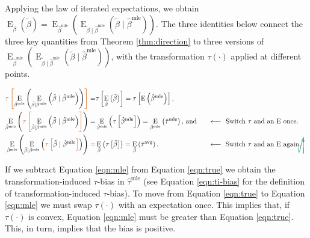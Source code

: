 \documentclass[11pt]{article}
\DeclareMathOperator*{\E}{\text{E}}
\newcommand{\tikzmark}[1]{\tikz[overlay,remember picture] \node (#1) {};}
\newcommand{\DrawBox}[2]{%
  \begin{tikzpicture}[overlay,remember picture]
    \draw[->,shorten >= 6pt, shorten <= 2pt, out=-90, in=90, distance=1.2cm, color2, thick] (MarkA.east) to (MarkB.east);
    \draw[->,shorten >= 6pt, shorten <= 2pt, out=-90, in=90, distance=1cm, color2, thick] (MarkC.west) to (MarkD.east);
  \end{tikzpicture}
}
\newcommand{\justif}[2]{&{#1}&\text{#2}}
\begin{document}
Applying the law of iterated expectations, we obtain $\E_{\tilde{\beta}} \left( \tilde{\beta} \right) = \E_{\hat{\beta}^\text{mle}}\left( \E_{\tilde{\beta} \mid \hat{\beta}^\text{mle}} (\tilde{\beta} \mid \hat{\beta}^\text{mle}) \right)$.
The three identities below connect the three key quantities from Theorem \ref{thm:direction} to three versions of $\E_{\hat{\beta}^\text{mle}}\left( \E_{\tilde{\beta} \mid \hat{\beta}^\text{mle}} (\tilde{\beta} \mid \hat{\beta}^\text{mle}) \right)$, with the transformation $\tau(\cdot)$ applied at different points.


\begin{alignat}{2}
 \color{color1} \tikzmark{MarkA}\tau \left[ \normalcolor \E_{\hat{\beta}^\text{mle}}\left( \E_{\tilde{\beta} \mid \hat{\beta}^\text{mle}} \left( \tilde{\beta} \mid \hat{\beta}^\text{mle} \right) \right) \color{color1} \right] \normalcolor =&  \tau \left[ \E_{\tilde{\beta}} \left( \tilde{\beta} \right) \right] = \tau \left[\E \left( \hat{\beta}^\text{mle} \right) \right]\text{,} \label{eqn:true}\\
 \E_{\hat{\beta}^\text{mle}}\left( \color{color1} \tikzmark{MarkB}\tau\tikzmark{MarkC} \left[ \normalcolor \E_{\tilde{\beta} \mid \hat{\beta}^\text{mle}} \left( \tilde{\beta} \mid \hat{\beta}^\text{mle} \right) \color{color1} \right] \normalcolor \right)  =&  \E_{\hat{\beta}^\text{mle}} \left( \tau \left[\hat{\beta}^\text{mle} \right] \right) =  \E_{\hat{\beta}^\text{mle}} \left(\hat{\tau}^\text{mle} \right) \text{, and} \justif{\quad}{$\longleftarrow~$ Switch $\tau$ and an $\E$ once.} \label{eqn:mle}\\
\E_{\hat{\beta}^\text{mle}}\left( \E_{\tilde{\beta} \mid \hat{\beta}^\text{mle}} \left( \color{color1} \tikzmark{MarkD}\tau \left[ \normalcolor \tilde{\beta} \mid \hat{\beta}^\text{mle} \color{color1} \right] \normalcolor \right) \right)  =&
\E_{\tilde{\beta}} \left( \tau \left[\tilde{\beta} \right] \right)  =
\E_{\tilde{\beta}} \left(\hat{\tau}^\text{avg} \right) \text{.}\justif{\quad}{$\longleftarrow~$ Switch $\tau$ and an $\E$ again.}\label{eqn:avg}\DrawBox{red}{blue}
\end{alignat}

If we subtract Equation \ref{eqn:mle} from Equation \ref{eqn:true} we obtain the transformation-induced $\tau$-bias in $\hat{\tau}^\text{mle}$ (see Equation \ref{eqn:ti-bias} for the definition of transformation-induced $\tau$-bias).
To move from Equation \ref{eqn:true} to Equation \ref{eqn:mle} we must swap $\tau(\cdot)$ with an expectation once.
This implies that, if $\tau(\cdot)$ is convex, Equation \ref{eqn:mle} must be greater than Equation \ref{eqn:true}.
This, in turn, implies that the bias is positive.
\end{document}

